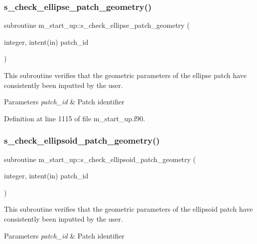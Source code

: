 \subsubsection{\texorpdfstring{s\+\_\+check\+\_\+ellipse\+\_\+patch\+\_\+geometry()}{s\_check\_ellipse\_patch\_geometry()}}
{\footnotesize\ttfamily subroutine m\+\_\+start\+\_\+up\+::s\+\_\+check\+\_\+ellipse\+\_\+patch\+\_\+geometry (\begin{DoxyParamCaption}\item[{integer, intent(in)}]{patch\+\_\+id }\end{DoxyParamCaption})}



This subroutine verifies that the geometric parameters of the ellipse patch have consistently been inputted by the user. 


\begin{DoxyParams}{Parameters}
{\em patch\+\_\+id} & Patch identifier \\
\hline
\end{DoxyParams}


Definition at line 1115 of file m\+\_\+start\+\_\+up.\+f90.

\mbox{\label{namespacem__start__up_a9cb00dcfe248d67b64c361ac57b6a269}} 
\subsubsection{\texorpdfstring{s\+\_\+check\+\_\+ellipsoid\+\_\+patch\+\_\+geometry()}{s\_check\_ellipsoid\_patch\_geometry()}}
{\footnotesize\ttfamily subroutine m\+\_\+start\+\_\+up\+::s\+\_\+check\+\_\+ellipsoid\+\_\+patch\+\_\+geometry (\begin{DoxyParamCaption}\item[{integer, intent(in)}]{patch\+\_\+id }\end{DoxyParamCaption})}



This subroutine verifies that the geometric parameters of the ellipsoid patch have consistently been inputted by the user. 


\begin{DoxyParams}{Parameters}
{\em patch\+\_\+id} & Patch identifier \\
\hline
\end{DoxyParams}


